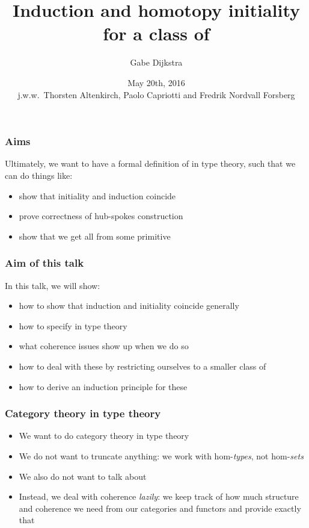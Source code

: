 \documentclass{beamer}
\title[Induction and initiality for \onehits]{Induction and homotopy initiality for a class of \onehits}
\author[Gabe Dijkstra]{
  Gabe Dijkstra
}
\institute[University of Nottingham]{
  University of Nottingham
 }
\date[May 20th, 2016]{May 20th, 2016 \\ \vspace{1cm} \small{j.w.w.\ Thorsten Altenkirch, Paolo Capriotti and Fredrik Nordvall Forsberg}}
\begin{document}
\begin{frame}
\maketitle
\end{frame}

\begin{frame}
  \frametitle{Aims}
  Ultimately, we want to have a formal definition of \hits in type
  theory, such that we can do things like:

  \begin{itemize}
  \item show that initiality and induction coincide
  \item prove correctness of hub-spokes construction
  \item show that we get all \hits from some primitive \hit
  \end{itemize}

\end{frame}

\begin{frame}
  \frametitle{Aim of this talk}
  In this talk, we will show:
  
  \begin{itemize}
  \item how to show that induction and initiality coincide generally
  \item how to specify \onehits in type theory
  \item what coherence issues show up when we do so
  \item how to deal with these by restricting ourselves to a smaller class of \onehits
  \item how to derive an induction principle for these \onehits
  \end{itemize}

\end{frame}

\begin{frame}
  \frametitle{Category theory in type theory}
  \begin{itemize}
  \item We want to do category theory in type theory
  \item We do not want to truncate anything: we work with
    hom-\emph{types}, not hom-\emph{sets}
  \item We also do not want to talk about \omegacats
  \item Instead, we deal with coherence \emph{lazily}: we keep track
    of how much structure and coherence we need from our categories
    and functors and provide exactly that
  \end{itemize}
\end{frame}
\end{document}
